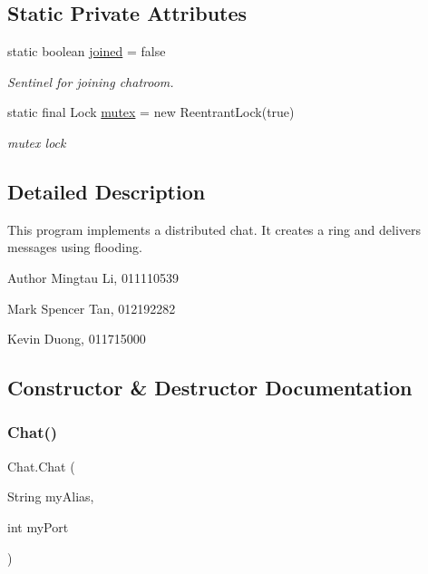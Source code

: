 \subsection*{Static Private Attributes}
\begin{DoxyCompactItemize}
\item 
\mbox{\label{class_chat_aabecdb7e794abb969b3a141365d372fe}} 
static boolean \hyperlink{class_chat_aabecdb7e794abb969b3a141365d372fe}{joined} = false
\begin{DoxyCompactList}\small\item\em Sentinel for joining chatroom. \end{DoxyCompactList}\item 
\mbox{\label{class_chat_a2d05c5a786842fdaabf5d54c5b34f1de}} 
static final Lock \hyperlink{class_chat_a2d05c5a786842fdaabf5d54c5b34f1de}{mutex} = new Reentrant\+Lock(true)
\begin{DoxyCompactList}\small\item\em mutex lock \end{DoxyCompactList}\end{DoxyCompactItemize}


\subsection{Detailed Description}
This program implements a distributed chat. It creates a ring and delivers messages using flooding. 

\begin{DoxyAuthor}{Author}
Mingtau Li, 011110539 

Mark Spencer Tan, 012192282 

Kevin Duong, 011715000 
\end{DoxyAuthor}


\subsection{Constructor \& Destructor Documentation}
\mbox{\label{class_chat_a2e9b5fbe06ab99eee05f0fc6af6dc887}} 
\subsubsection{\texorpdfstring{Chat()}{Chat()}}
{\footnotesize\ttfamily Chat.\+Chat (\begin{DoxyParamCaption}\item[{String}]{my\+Alias,  }\item[{int}]{my\+Port }\end{DoxyParamCaption})}

